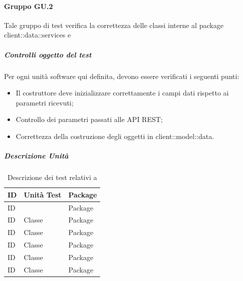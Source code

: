 \documentclass[12pt,a4paper]{article}
\begin{document}
\paragraph{Gruppo GU.2 }
Tale gruppo di test verifica la correttezza delle classi interne al package client::data::services e
\subparagraph{Controlli oggetto del test}
Per ogni unità software qui definita, devono essere verificati i seguenti punti:
\begin{itemize}
	\item Il costruttore deve inizializzare correttamente i campi dati rispetto ai parametri ricevuti;
	\item Controllo dei parametri passati alle API REST;
	\item Correttezza della costruzione degli oggetti in client::model::data.
\end{itemize}
\subparagraph{Descrizione Unità}
\begin{table}[H]
	\begin{center}
		\begin{tabular}{p{} p{} p{}}
			\toprule
			\textbf{ID}   & \textbf{Unità Test}	& \textbf{Package} \\ \midrule
			\midrule
			ID &  & Package\\ \midrule
			ID & Classe & Package\\ \midrule
			ID & Classe & Package\\ \midrule
			ID & Classe & Package\\ \midrule
			ID & Classe & Package\\ \midrule
			ID & Classe & Package\\ \midrule
			
			\bottomrule
		\end{tabular}
	\end{center}
	\caption{Descrizione dei test relativi a \TODO{}}
\end{table}
\end{document}
